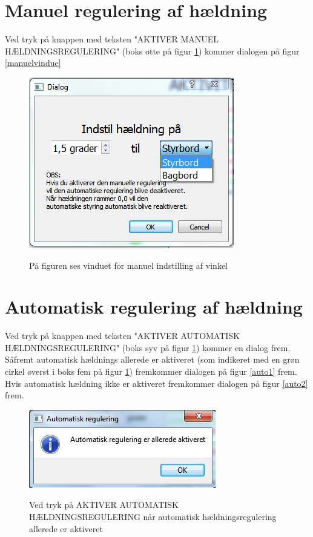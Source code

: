 \section*{Manuel regulering af hældning}
Ved tryk på knappen med teksten "AKTIVER MANUEL HÆLDNINGSREGULERING" (boks otte på figur \ref{fig:hovedvindue}) kommer dialogen på figur \ref{manuelvindue}
\begin{figure}[H]
\centering
\includegraphics[scale=1]{billeder/GUI/manuelvindue}
\label{fig:hovedvindue}
\caption{På figuren ses vinduet for manuel indstilling af vinkel}
\end{figure}

\section*{Automatisk regulering af hældning}
Ved tryk på knappen med teksten "AKTIVER AUTOMATISK HÆLDNINGSREGULERING" (boks syv på figur \ref{fig:hovedvindue}) kommer en dialog frem. Såfremt automatisk hældnings allerede er aktiveret (som indikeret med en grøn cirkel øverst i boks fem på figur \ref{fig:hovedvindue}) fremkommer dialogen på figur \ref{auto1} frem.
Hvis automatisk hældning ikke er aktiveret fremkommer dialogen på figur \ref{auto2} frem.

\begin{figure}[h]
\centering
\includegraphics[scale=1]{billeder/GUI/auto1}
\label{fig:auto1}
\caption{Ved tryk på AKTIVER AUTOMATISK HÆLDNINGSREGULERING når automatisk hældningsregulering allerede er aktiveret}
\end{figure}

